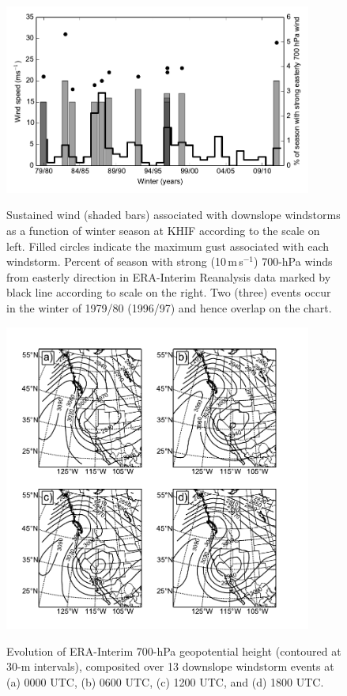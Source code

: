 \documentclass[pdftex,12pt]{article}
\def\mps{m\,s$^{-1}$}
\begin{document}
\begin{figure}[t]
\centering
\includegraphics[width=0.9\textwidth]{climoplot.pdf}\\
\caption{Sustained wind (shaded bars) associated with downslope windstorms as a function of winter season at KHIF according to the scale on left. Filled circles indicate the maximum gust associated with each windstorm. Percent of season with strong (10\,\mps{}) 700-hPa winds from easterly direction in ERA-Interim Reanalysis data marked by black line according to scale on the right. Two (three) events occur in the winter of 1979/80 (1996/97) and hence overlap on the chart.}
\label{fig:climoplot}
\end{figure}

\begin{figure}[t]
\centering
\includegraphics[width=0.9\textwidth]{composite_700hPa_Z.pdf}\\
\caption{Evolution of ERA-Interim 700-hPa geopotential height (contoured at 30-m intervals), composited over 13 downslope windstorm events at (a) 0000 UTC, (b) 0600 UTC, (c) 1200 UTC, and (d) 1800 UTC.}
\label{fig:700comp}
\end{figure}
\end{document}
